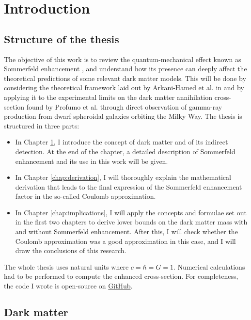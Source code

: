 \chapter{Introduction}\label{chap:introduction}

\section{Structure of the thesis}
The objective of this work is to review the quantum-mechanical effect known as Sommerfeld enhancement \cite{Sommerfeld_1931}, and understand how its presence can deeply affect the theoretical predictions of some relevant dark matter models. This will be done by considering the theoretical framework laid out by Arkani-Hamed et al. in \cite{Arkani_2009} and by applying it to the experimental limits on the dark matter annihilation cross-section found by Profumo et al. \cite{Profumo_2018} through direct observation of gamma-ray production from dwarf spheroidal galaxies orbiting the Milky Way. The thesis is structured in three parts:
\begin{itemize}
	\item In Chapter \ref{chap:introduction}, I introduce the concept of dark matter and of its indirect detection. At the end of the chapter, a detailed description of Sommerfeld enhancement and its use in this work will be given.
	\item In Chapter \ref{chap:derivation}, I will thoroughly explain the mathematical derivation that leads to the final expression of the Sommerfeld enhancement factor in the so-called Coulomb approximation.
	\item In Chapter \ref{chap:implications}, I will apply the concepts and formulae set out in the first two chapters to derive lower bounds on the dark matter mass with and without Sommerfeld enhancement. After this, I will check whether the Coulomb approximation was a good approximation in this case, and I will draw the conclusions of this research.
\end{itemize}

The whole thesis uses natural units where \(c=\hbar=G=1\). Numerical calculations had to be performed to compute the enhanced cross-section. For completeness, the code I wrote is open-source on \href{https://github.com/LuckeeDev/bachelor-thesis}{GitHub}.

\section{Dark matter}

